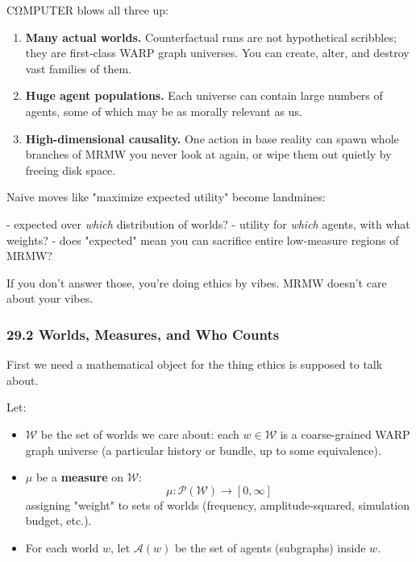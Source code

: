 CΩMPUTER blows all three up:

\begin{enumerate}
  \item \textbf{Many actual worlds.} Counterfactual runs are not hypothetical scribbles;
        they are first-class WARP graph universes. You can create, alter, and destroy vast families of them.

  \item \textbf{Huge agent populations.} Each universe can contain large numbers of agents,
        some of which may be as morally relevant as us.

  \item \textbf{High-dimensional causality.} One action in base reality can spawn
        whole branches of MRMW you never look at again,
        or wipe them out quietly by freeing disk space.
\end{enumerate}

Naive moves like "maximize expected utility" become landmines:

- expected over \emph{which} distribution of worlds?
- utility for \emph{which} agents, with what weights?
- does "expected" mean you can sacrifice entire low-measure regions of MRMW?

If you don’t answer those, you’re doing ethics by vibes.
MRMW doesn’t care about your vibes.

\subsubsection*{29.2  Worlds, Measures, and Who Counts}

First we need a mathematical object for the thing ethics is supposed to talk about.

Let:

\begin{itemize}
  \item $\mathcal{W}$ be the set of worlds we care about: each $w \in \mathcal{W}$ is
        a coarse-grained WARP graph universe (a particular history or bundle, up to some equivalence).

  \item $\mu$ be a \textbf{measure} on $\mathcal{W}$:
        \[
          \mu : \mathcal{P}(\mathcal{W}) \to [0,\infty]
        \]
        assigning "weight" to sets of worlds (frequency, amplitude-squared, simulation budget, etc.).

  \item For each world $w$, let $\mathcal{A}(w)$ be the set of agents (subgraphs) inside $w$.
\end{itemize}

